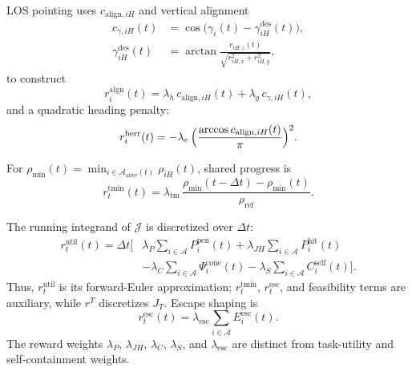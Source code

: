 \documentclass{cja}
\begin{document}
LOS pointing uses $c_{\mathrm{align},iH}$ and vertical alignment
\begin{equation}
\begin{aligned}
c_{\gamma,iH}(t)
&=\cos\!\bigl(\gamma_i(t)-\gamma_{iH}^{\mathrm{des}}(t)\bigr),\\
\gamma_{iH}^{\mathrm{des}}(t)
&=\arctan\!\frac{r_{iH,z}(t)}{\sqrt{r_{iH,x}^{2}+r_{iH,y}^{2}}},
\end{aligned}
\end{equation}
to construct
\begin{equation}
r_i^{\mathrm{algn}}(t)=\lambda_h\,c_{\mathrm{align},iH}(t)+\lambda_g\,c_{\gamma,iH}(t),
\label{eq:r-align}
\end{equation}
and a quadratic heading penalty:
\begin{equation}
r_i^{\mathrm{herr}}(t)=-\lambda_e\,\Bigl(\dfrac{\arccos c_{\mathrm{align},iH}(t)}{\pi}\Bigr)^{2}.
\label{eq:r-herr}
\end{equation}

For $\rho_{\min}(t)=\min_{i\in\mathcal{A}_{\mathrm{alive}}(t)}\rho_{iH}(t)$, shared progress is
\begin{equation}
r_t^{\mathrm{tmin}}(t)=\lambda_{\mathrm{tm}}\,\frac{\rho_{\min}(t-\Delta t)-\rho_{\min}(t)}{\rho_{\mathrm{ref}}}.
\label{eq:r-team}
\end{equation}

The running integrand of $\mathcal J$ is discretized over $\Delta t$:
\begin{equation}
\begin{aligned}
r_t^{\mathrm{util}}(t)
=
\Delta t
\Biggl[
&
\lambda_P
\sum_{i\in\mathcal A}
P_i^{\mathrm{pen}}(t)
+
\lambda_{JH}
\sum_{i\in\mathcal A}
P_i^{\mathrm{hit}}(t)
\\
&-
\lambda_C
\sum_{i\in\mathcal A}
\Psi_i^{\mathrm{cone}}(t)
-
\lambda_S
\sum_{i\in\mathcal A}
C_i^{\mathrm{self}}(t)
\Biggr].
\end{aligned}
\label{eq:r-prior}
\end{equation}
Thus, $r_t^{\mathrm{util}}$ is its forward-Euler approximation; $r_t^{\mathrm{tmin}}$, $r_t^{\mathrm{esc}}$, and feasibility terms are auxiliary, while $r^T$ discretizes $J_T$. Escape shaping is
\begin{equation}
r_t^{\mathrm{esc}}(t)=\lambda_{\mathrm{esc}}\sum_{i\in\mathcal{A}}E_i^{\mathrm{esc}}(t).
\end{equation}
The reward weights $\lambda_P$, $\lambda_{JH}$, $\lambda_C$, $\lambda_S$, and $\lambda_{\mathrm{esc}}$ are distinct from task-utility and self-containment weights.
\end{document}
